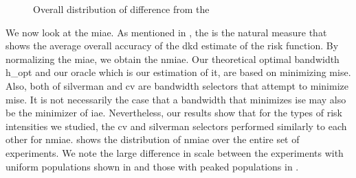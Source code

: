 \begin{figure}[htbp]
\begin{subfigure}[t]{0.45\textwidth}
        \label{fig:discussion:overall_nmise_diff_boxplot:peak}
    \end{subfigure}
    \caption{Overall distribution of  difference from the }
    \label{fig:discussion:overall_nmise_diff_boxplot}
\end{figure}

We now look at the \gls{miae}.
As mentioned in ,
the  is the natural measure that shows the average overall accuracy of the \gls{dkd} estimate of the \gls{risk} function.
By normalizing the \gls{miae}, we obtain the \gls{nmiae}.
Our theoretical optimal bandwidth \gls{h_opt} and our \gls{oracle} which is our estimation of it,
are based on minimizing \gls{mise}.
Also, both of \gls{silverman} and \gls{cv} are bandwidth selectors that attempt to minimize \gls{mise}.
It is not necessarily the case that a bandwidth that minimizes \gls{ise} may also be the minimizer of \gls{iae}.
Nevertheless, our results show that for the types of \gls{risk} intensities we studied,
the \gls{cv} and \gls{silverman} selectors performed similarly to each other for \gls{nmiae}.
 shows the distribution of \gls{nmiae} over the entire set of experiments.
We note the large difference in scale between the experiments with uniform populations shown in  and those with peaked populations in .


